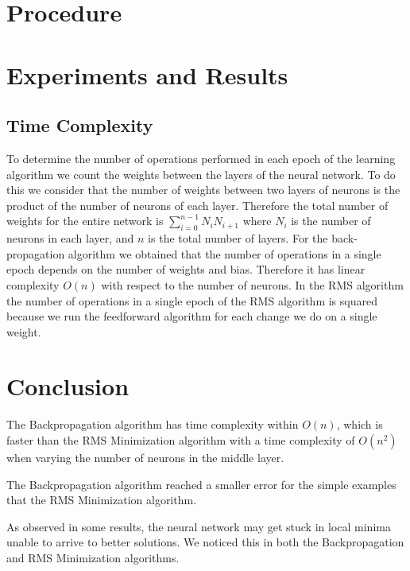 \documentclass[11pt]{article}
\begin{document}

\section{Procedure} %
\label{sec:procedure}



\section{Experiments and Results} %
\label{sec:results}

\subsection{Time Complexity} %
\label{sub:time_complexity}

To determine the number of operations performed in each epoch of the learning algorithm we count the weights between the layers of the
neural network. To do this we consider that the number of weights between two layers of neurons is the product of the number of neurons
of each layer. Therefore the total number of weights for the entire network is $\sum_{i=0}^{n-1}N_{i}N_{i+1}$ where $N_{i}$ is the
number of neurons in each layer, and $n$ is the total number of layers. For the back-propagation algorithm we obtained that the number
of operations in a single epoch depends on the number of weights and bias. Therefore it has linear complexity $O(n)$ with respect to the
number of neurons. In the RMS algorithm the number of operations in a single epoch of the RMS algorithm is squared because we run the
feedforward algorithm for each change we do on a single weight.



\section{Conclusion} %
\label{sec:conclusion}

The Backpropagation algorithm has time complexity within $O(n)$, which is faster than the RMS Minimization algorithm with a time
complexity of $O(n^{2})$ when varying the number of neurons in the middle layer. 

The Backpropagation algorithm reached a smaller error for the simple examples that the RMS Minimization algorithm.

As observed in some results, the neural network may get stuck in local minima unable to arrive to better solutions. We noticed this in
both the Backpropagation and RMS Minimization algorithms.

    


\end{document}
